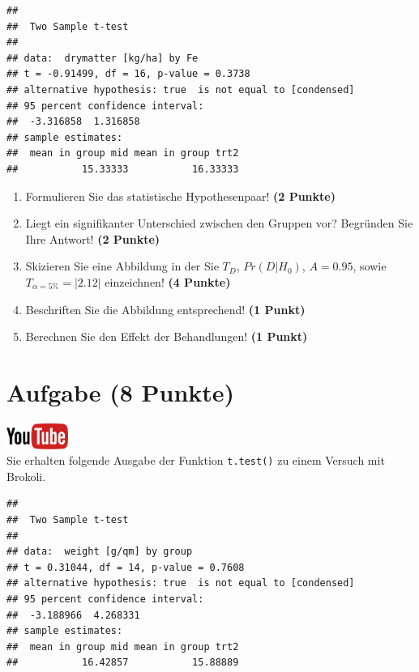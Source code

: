 \documentclass[a4paper, 9pt]{scrartcl}\usepackage[]{graphicx}\usepackage[]{xcolor}
\makeatletter
\newenvironment{kframe}{%
 \def\at@end@of@kframe{}%
 \ifinner\ifhmode%
  \def\at@end@of@kframe{\end{minipage}}%
  \begin{minipage}{\columnwidth}%
 \fi\fi%
 \def\FrameCommand##1{\hskip\@totalleftmargin \hskip-\fboxsep
 \colorbox{shadecolor}{##1}\hskip-\fboxsep
     \hskip-\linewidth \hskip-\@totalleftmargin \hskip\columnwidth}%
 \MakeFramed {\advance\hsize-\width
   \@totalleftmargin\z@ \linewidth\hsize
   \@setminipage}}%
 {\par\unskip\endMakeFramed%
 \at@end@of@kframe}
\newenvironment{knitrout}{}{} %
\makeatother
\begin{document}
\begin{knitrout}
\color{fgcolor}\begin{kframe}
\begin{verbatim}
## 
## 	Two Sample t-test
## 
## data:  drymatter [kg/ha] by Fe
## t = -0.91499, df = 16, p-value = 0.3738
## alternative hypothesis: true  is not equal to [condensed]
## 95 percent confidence interval:
##  -3.316858  1.316858
## sample estimates:
##  mean in group mid mean in group trt2 
##           15.33333           16.33333
\end{verbatim}
\end{kframe}
\end{knitrout}


\begin{enumerate}
  \item Formulieren Sie das statistische Hypothesenpaar! \textbf{(2
Punkte)}
\item Liegt ein signifikanter Unterschied zwischen den Gruppen vor?
  Begr{\"u}nden Sie Ihre Antwort! \textbf{(2 Punkte)}
\item Skizieren Sie eine Abbildung in der Sie $T_{D}$, $Pr(D|H_0)$, $A=0.95$,
  sowie $T_{\alpha=5\%} = |2.12|$ einzeichnen! \textbf{(4 Punkte)}
\item Beschriften Sie die Abbildung entsprechend! \textbf{(1 Punkt)}  
\item Berechnen Sie den Effekt der Behandlungen! \textbf{(1 Punkt)}
\end{enumerate} 
\clearpage

\section{Aufgabe \hfill (8 Punkte)}

\hfill\href{https://youtu.be/wJqsNV1hOW8}{\includegraphics[width =
  2cm]{img/youtube}}\\[1Ex]



Sie erhalten folgende \Rlogo Ausgabe der Funktion \texttt{t.test()} zu einem Versuch mit Brokoli.

\begin{knitrout}
\color{fgcolor}\begin{kframe}
\begin{verbatim}
## 
## 	Two Sample t-test
## 
## data:  weight [g/qm] by group
## t = 0.31044, df = 14, p-value = 0.7608
## alternative hypothesis: true  is not equal to [condensed]
## 95 percent confidence interval:
##  -3.188966  4.268331
## sample estimates:
##  mean in group mid mean in group trt2 
##           16.42857           15.88889
\end{verbatim}
\end{kframe}
\end{knitrout}
\end{document}

